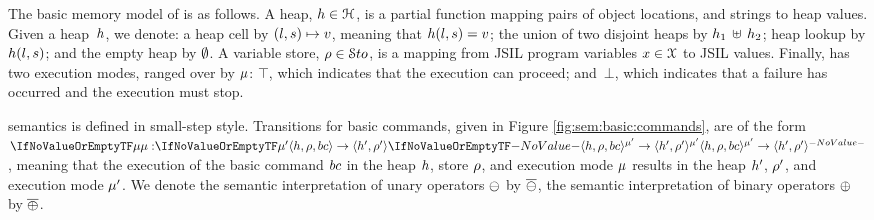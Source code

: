 The basic memory model of \jsil is as follows. 
A \jsil heap, $h \in {\mathcal H}$, is a partial function mapping pairs of  object locations, and strings to heap values. 
 Given a heap~$h$, we denote: a heap cell by $(l, s) \mapsto v$, meaning that  $h(l,s) = v$; the union of two disjoint heaps by $h_1 \, \uplus \, h_2$; heap lookup by $h(l, s)$; and the empty heap by $\emptyset$.
A \jsil variable store, $\rho \in \mathcal{S}to$, is a mapping from JSIL program variables $x \in \mathcal{X}$ to JSIL values. Finally, \jsil has two execution modes, ranged over by $\mu$: $\top$, which indicates that the execution can proceed; and~$\bot$, which indicates that a failure has occurred and the execution must stop. 

\jsil semantics is defined in small-step style. Transitions for basic commands, given in Figure \ref{fig:sem:basic:commands}, are of the form $\semtrans[\mode][\mode']{\heap, \store, \bcmd}{\heap', \store'}$, meaning that the execution of the basic command $bc$ in the heap $h$, store $\rho$, and execution mode $\mu$ results in the heap $h'$, $\rho'$, and execution mode $\mu'$. 
We denote the semantic interpretation of unary operators $\ominus$ by $\overline{\ominus}$, the semantic interpretation of binary operators $\oplus$ by $\overline{\oplus}$.

